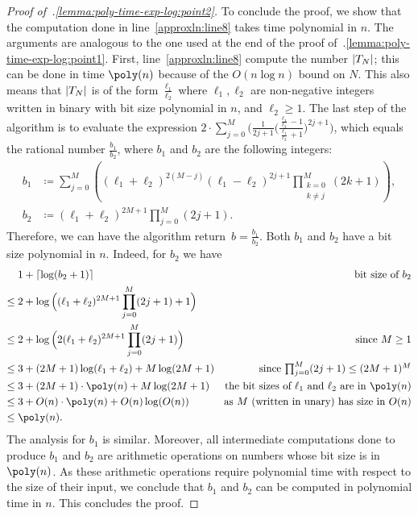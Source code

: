\begin{proof}[Proof of~.\ref{lemma:poly-time-exp-log:point2}]
  To conclude the proof, we show that the computation done in
  line~\ref{approxln:line8} takes time polynomial in $n$. The arguments are
  analogous to the one used at the end of the proof
  of~.\ref{lemma:poly-time-exp-log:point1}. First,
  line~\ref{approxln:line8} compute the number $\left|T_N\right|$; this can be done in
  time $\poly(n)$ because of the $O(n \log n)$ bound on $N$. This also means
  that $\left|T_N\right|$ is of the form $\frac{\ell_1}{\ell_2}$ where $\ell_1,\ell_2$
  are non-negative integers written in binary with bit size polynomial in $n$,
  and $\ell_2 \geq 1$. The last step of the algorithm is to evaluate the
  expression $2 \cdot \sum_{j=0}^M \big(\frac{1}{2j+1}
  \big(\frac{\frac{\ell_1}{\ell_2}-1}{\frac{\ell_1}{\ell_2}+1}\big)^{2j+1}\big)$,
  which equals the rational number $\frac{b_1}{b_2}$, where $b_1$ and $b_2$ are
  the following integers:
  \begin{align*}
    b_1 &\coloneqq \sum_{j=0}^M \left( (\ell_1+\ell_2)^{2(M-j)}(\ell_1-\ell_2)^{2j+1}\prod_{\substack{k=0\\k\neq j}}^M(2k+1) \right),\\
    b_2 &\coloneqq (\ell_1+\ell_2)^{2M+1} \prod_{j=0}^M (2j+1).
  \end{align*}
  Therefore, we can have the algorithm return~$b = \frac{b_1}{b_2}$. Both $b_1$
  and $b_2$ have a bit size polynomial in $n$. Indeed, for $b_2$ we have 
  \begin{align*}
          &1+\ceil{\log(b_2+1)} &\text{bit size of $b_2$}\\
    \leq{}&2+\log\Big((\ell_1+\ell_2)^{2M+1} \prod_{j=0}^M (2j+1)+1\Big)\\
    \leq{}&2+\log\Big(2(\ell_1+\ell_2)^{2M+1} \prod_{j=0}^M (2j+1)\Big) &\text{since $M \geq 1$}\\
    \leq{}&3+ (2M+1)\log(\ell_1+\ell_2) + M \log(2M+1) &\text{since $\textstyle\prod_{j=0}^M (2j+1) \leq (2M+1)^M$}\\
    \leq{}&3+ (2M+1) \cdot \poly(n) + M \log(2M+1) &\text{the bit sizes of $\ell_1$ and $\ell_2$ are in $\poly(n)$}\\
    \leq{}&3+ O(n) \cdot \poly(n) + O(n) \log( O(n) ) &\hspace{-8pt}\text{as $M$ (written in unary) has size in $O(n)$}\\
    \leq{}&\poly(n).
  \end{align*}
  The analysis for $b_1$ is similar. Moreover, all intermediate computations
  done to produce $b_1$ and $b_2$ are arithmetic operations on numbers whose bit
  size is in $\poly(n)$. As these arithmetic operations require
  polynomial time with respect to the size of their input, we conclude that
  $b_1$ and $b_2$ can be computed in polynomial time in $n$. 
  This concludes the proof.
\end{proof}

